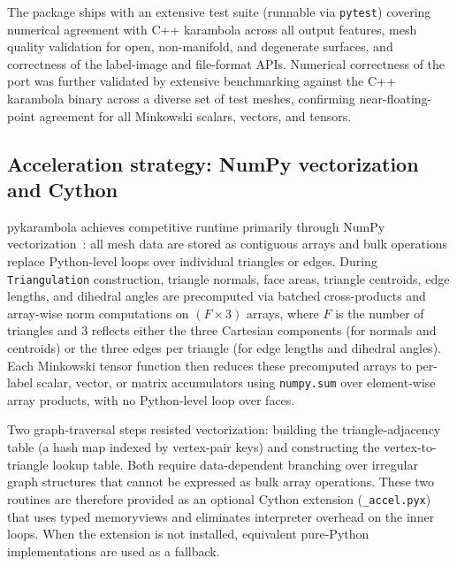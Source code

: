 \documentclass[times, twoside, watermark]{zHenriquesLab-StyleBioRxiv}
\begin{document}
The package ships with an extensive test suite (runnable via \texttt{pytest}) covering numerical agreement with C++ karambola across all output features, mesh quality validation for open, non-manifold, and degenerate surfaces, and correctness of the label-image and file-format APIs.
Numerical correctness of the port was further validated by extensive benchmarking against the C++ karambola binary across a diverse set of test meshes, confirming near-floating-point agreement for all Minkowski scalars, vectors, and tensors.

\subsection*{Acceleration strategy: NumPy vectorization and Cython}
pykarambola achieves competitive runtime primarily through NumPy vectorization~\cite{harris2020numpy}: all mesh data are stored as contiguous arrays and bulk operations replace Python-level loops over individual triangles or edges.
During \texttt{Triangulation} construction, triangle normals, face areas, triangle centroids, edge lengths, and dihedral angles are precomputed via batched cross-products and array-wise norm computations on $(F \times 3)$ arrays, where $F$ is the number of triangles and 3 reflects either the three Cartesian components (for normals and centroids) or the three edges per triangle (for edge lengths and dihedral angles).
Each Minkowski tensor function then reduces these precomputed arrays to per-label scalar, vector, or matrix accumulators using \texttt{numpy.sum} over element-wise array products, with no Python-level loop over faces.

Two graph-traversal steps resisted vectorization: building the triangle-adjacency table (a hash map indexed by vertex-pair keys) and constructing the vertex-to-triangle lookup table.
Both require data-dependent branching over irregular graph structures that cannot be expressed as bulk array operations.
These two routines are therefore provided as an optional Cython extension (\texttt{\_accel.pyx}) that uses typed memoryviews and eliminates interpreter overhead on the inner loops.
When the extension is not installed, equivalent pure-Python implementations are used as a fallback.
\end{document}
